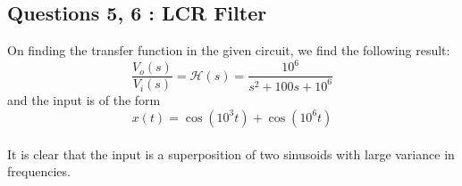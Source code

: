 \documentclass[11pt, a4paper]{article}
\begin{document}
	\subsection{Questions 5, 6 : LCR Filter}
 	
    	On finding the transfer function in the given circuit, we find the following result:\\
	\begin{equation}
        \frac{V_o(s)}{V_i(s)} = \mathcal{H}(s) = \frac{10^6}{s^2+100s+10^6}
    \end{equation}
	and the input is of the form
	\[x(t) = \cos{(10^3t)}+\cos{(10^6t)} \]\\
        
       It is clear that the input is a superposition of two sinusoids with large variance in frequencies.\\
       
\end{document}
